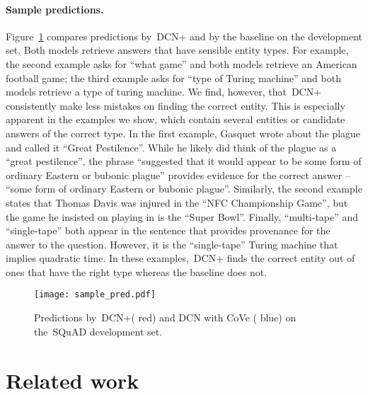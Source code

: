 \documentclass{article} \usepackage{iclr2018_conference,times}
\newcommand{\modelname}{DCN+\xspace}
\newcommand{\squad}{SQuAD\xspace}
\begin{document}
\paragraph{Sample predictions.}
Figure~\ref{fig:sample_pred} compares predictions by~\modelname and by the baseline on the development set.
Both models retrieve answers that have sensible entity types.
For example, the second example asks for ``what game'' and both models retrieve an American football game;
the third example asks for ``type of Turing machine'' and both models retrieve a type of turing machine.
We find, however, that~\modelname consistently make less mistakes on finding the correct entity.
This is especially apparent in the examples we show, which contain several entities or candidate answers of the correct type.
In the first example, Gasquet wrote about the plague and called it ``Great Pestilence''.
While he likely did think of the plague as a ``great pestilence'', the phrase ``suggested that it would appear to be some form of ordinary Eastern or bubonic plague'' provides evidence for the correct answer -- ``some form of ordinary Eastern or bubonic plague''.
Similarly, the second example states that Thomas Davis was injured in the ``NFC Championship Game'', but the game he insisted on playing in is the ``Super Bowl''.
Finally, ``multi-tape'' and ``single-tape'' both appear in the sentence that provides provenance for the answer to the question.
However, it is the ``single-tape'' Turing machine that implies quadratic time.
In these examples,~\modelname finds the correct entity out of ones that have the right type whereas the baseline does not.


\begin{figure}[!htb]
\vspace{-3mm}
\texttt{[image: sample\_pred.pdf]}
\vspace{-3mm}
\caption{
	Predictions by~\modelname ({\color{myred} red}) and DCN with CoVe ({\color{myblue} blue}) on the~\squad development set.
}\label{fig:sample_pred}
\vspace{-2mm}
\end{figure}




\section{Related work}
\vspace{-2mm}
\end{document}
